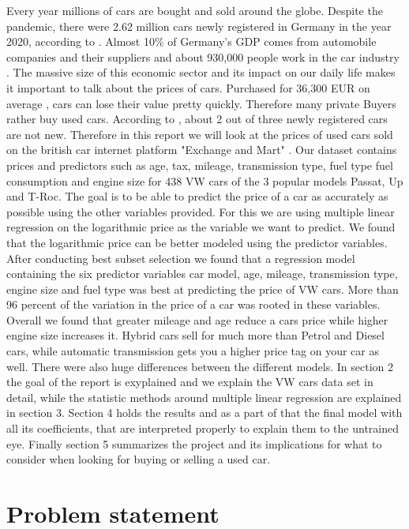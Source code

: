 \documentclass[12 pt]{scrartcl}
\begin{document}
Every year millions of cars are bought and sold around the globe. Despite the pandemic, there were 2.62 million cars newly registered in Germany in the year 2020, according to \citet{Statisti39}.
Almost 10\% of Germany's GDP comes from automobile companies and their suppliers and about 930,000 people work in the car industry \citep{dw}.
The massive size of this economic sector and its impact on our daily life makes it important to talk about the prices of cars. Purchased for 36,300 EUR on average \citep{Statista2}, cars can lose their value pretty quickly. Therefore many private Buyers rather buy used cars. According to \citet{Handelsblatt}, about 2 out of three newly registered cars are not new. Therefore in this report we will look at the prices of used cars sold on the british car internet platform "Exchange and Mart" \citep{Exchangeandmart}. Our dataset contains prices and predictors such as age, tax, mileage, transmission type, fuel type  fuel consumption and engine size for 438 VW cars of the 3 popular models Passat, Up and T-Roc. The goal is to be able to predict the price of a car as accurately as possible using the other variables provided. For this we are using multiple linear regression on the logarithmic price as the variable we want to predict. We found that the logarithmic price can be better modeled using the predictor variables. After conducting best subset selection we found that a regression model containing the six predictor variables car model, age, mileage, transmission type, engine size and fuel type was best at predicting the price of VW cars. More than 96 percent of the variation in the price of a car was rooted in these variables. Overall we found that greater mileage and age reduce a cars price while higher engine size increases it. Hybrid cars sell for much more than Petrol and Diesel cars, while automatic transmission gets you a higher price tag on your car as well.
There were also huge differences between the different models.
In section 2 the goal of the report is exyplained and we explain the VW cars data set in detail, while the statistic methods around multiple linear regression are explained in section 3. Section 4 holds the results and as a part of that the final model with all its coefficients, that are interpreted properly to explain them to the untrained eye. Finally section 5 summarizes the project and its implications for what to consider when looking for buying or selling a used car.

\section{Problem statement}
\end{document}
